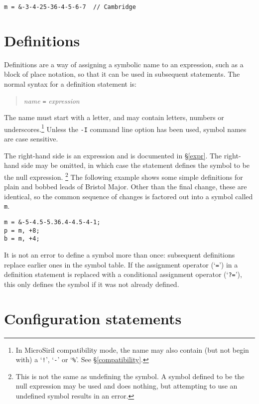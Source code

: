 \documentclass[a4paper,11pt,oneside]{book}
\makeatletter
\newcommand{\oi}[1]{\index{#1@{\hspace*{-\optwidth}\texttt{-}\texttt{#1}}}}
\newcommand{\sref}[1]{\hyperref[#1]{\S\ref{#1}}}
\makeatother
\begin{document}
\begin{Verbatim}
m = &-3-4-25-36-4-5-6-7  // Cambridge
\end{Verbatim}

\section{Definitions}\label{defnstmt}

Definitions are a way of assigning a symbolic name to an expression,
such as a block of place notation, so that it can be used in subsequent
statements.  The normal syntax for a definition statement is:

\begin{quote}
\textit{name} \;\verb+=+\; \textit{expression}
\end{quote}

The name must start with a letter, and may contain letters, numbers or
underscores.\footnote{In MicroSiril compatibility mode, the name may
also contain (but not begin with) a `\verb+!+', `\verb+-+' or
`\verb+%+'.  See \sref{compatibility}.} Unless the \verb+-I+\oi{I}
command line option has been used, symbol names are case sensitive. 

The right-hand side is an expression and is documented in
\sref{expr}.  The right-hand side may be omitted, in which case the
statement defines the symbol to be the null expression.%
\footnote{This is not the same as undefining the symbol.  A symbol
defined to be the null expression may be used and does nothing, but
attempting to use an undefined symbol results in an error.}
The following example shows some simple definitions for plain and bobbed
leads of Bristol Major.  Other than the final change, these are
identical, so the common sequence of changes is factored out into a
symbol called \texttt{m}.

\begin{Verbatim}
m = &-5-4.5-5.36.4-4.5-4-1;
p = m, +8;
b = m, +4;
\end{Verbatim}

It is not an error to define a symbol more than once: subsequent
definitions replace earlier ones in the symbol table.  If the assignment
operator (`\verb+=+') in a definition statement is replaced with a
conditional assignment operator
(`\verb+?=+'), this only defines the symbol if it was not already
defined.

\section{Configuration statements}
\label{configstmts}
\end{document}
